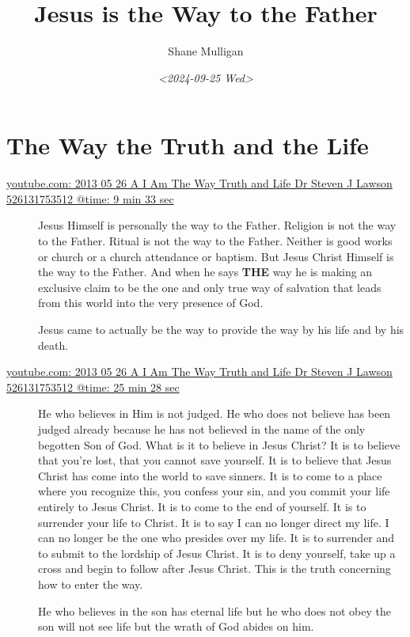 \documentclass[11pt]{article}
\author{Shane Mulligan}
\date{\textit{<2024-09-25 Wed>}}
\title{Jesus is the Way to the Father}
\begin{document}
\maketitle

\section{The Way the Truth and the Life}
\label{sec:orgb0f89ef}

\begin{description}
\item[{\href{https://youtube.com/watch?v=-33jh183A1s\&t=573}{youtube.com: 2013 05 26 A I Am The Way  Truth and Life   Dr  Steven J  Lawson   526131753512 @time: 9 min 33 sec}}] Jesus Himself is personally the way to the
Father. Religion is not the way to the
Father. Ritual is not the way to the
Father. Neither is good works or church
or a church attendance or baptism. But
Jesus Christ Himself is the way to the
Father. And when he says \textbf{THE} way he is
making an exclusive claim to be the one
and only true way of salvation that
leads from this world into the very
presence of God.

Jesus came to actually be the way to provide the
way by his life and by his death.

\item[{\href{https://youtube.com/watch?v=-33jh183A1s\&t=1528}{youtube.com: 2013 05 26 A I Am The Way  Truth and Life   Dr  Steven J  Lawson   526131753512 @time: 25 min 28 sec}}] He who believes in Him is not judged. He who
does not believe has been judged already
because he has not believed in the name
of the only begotten Son of God. What is
it to believe in Jesus Christ? It is to
believe that you're lost, that you cannot
save yourself. It is to believe that
Jesus Christ has come into the world to
save sinners. It is to come to a place
where you recognize this, you confess
your sin, and you commit your life
entirely to Jesus Christ. It is to come
to the end of yourself. It is to
surrender your life to Christ. It is to
say I can no longer direct my life. I can
no longer be the one who presides over
my life. It is to surrender and to submit
to the lordship of Jesus Christ. It is to
deny yourself, take up a cross and begin
to follow after Jesus Christ. This is the
truth concerning how to enter the way.

He who believes in the son
has eternal life but he who does not
obey the son will not see life but the
wrath of God abides on him.


\end{description}
\end{document}
